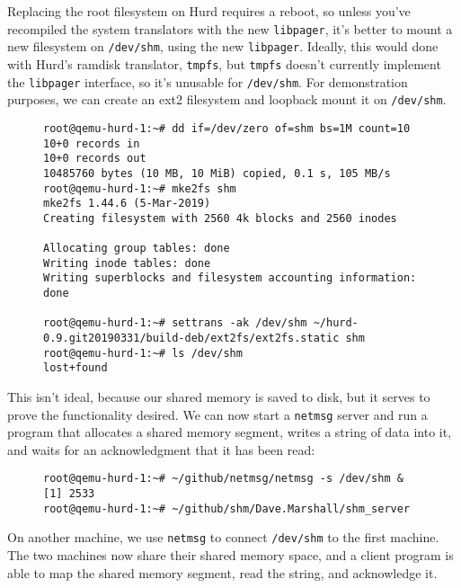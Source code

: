\documentclass{article}
\def\libpager{{\tt libpager}\xspace}
\def\netmsg{{\tt netmsg}\xspace}
\begin{document}

Replacing the root filesystem on Hurd requires a reboot, so unless
you've recompiled the system translators with the new \libpager, it's
better to mount a new filesystem on {\tt /dev/shm}, using the new
\libpager.  Ideally, this would done with Hurd's ramdisk translator,
         {\tt tmpfs}, but {\tt tmpfs} doesn't currently implement
the \libpager interface, so it's unusable for {\tt /dev/shm}.
For demonstration purposes, we can create an ext2 filesystem
and loopback mount it on {\tt /dev/shm}.

\begin{figure}[h]
\begin{mdframed}
\begin{verbatim}
root@qemu-hurd-1:~# dd if=/dev/zero of=shm bs=1M count=10    
10+0 records in
10+0 records out
10485760 bytes (10 MB, 10 MiB) copied, 0.1 s, 105 MB/s
root@qemu-hurd-1:~# mke2fs shm
mke2fs 1.44.6 (5-Mar-2019)
Creating filesystem with 2560 4k blocks and 2560 inodes

Allocating group tables: done                            
Writing inode tables: done                            
Writing superblocks and filesystem accounting information: done

root@qemu-hurd-1:~# settrans -ak /dev/shm ~/hurd-0.9.git20190331/build-deb/ext2fs/ext2fs.static shm
root@qemu-hurd-1:~# ls /dev/shm
lost+found
\end{verbatim}
\end{mdframed}
\end{figure}

This isn't ideal, because our shared memory is saved to disk, but it
serves to prove the functionality desired.  We can now start a \netmsg
server and run a program that allocates a shared memory segment,
writes a string of data into it, and waits for an acknowledgment
that it has been read:

\begin{figure}[h]
\begin{mdframed}
\begin{verbatim}
root@qemu-hurd-1:~# ~/github/netmsg/netmsg -s /dev/shm &
[1] 2533
root@qemu-hurd-1:~# ~/github/shm/Dave.Marshall/shm_server 
\end{verbatim}
\end{mdframed}
\end{figure}

On another machine, we use \netmsg to connect {\tt /dev/shm} to the
first machine.  The two machines now share their shared memory space,
and a client program is able to map the shared memory segment, read
the string, and acknowledge it.
\end{document}
